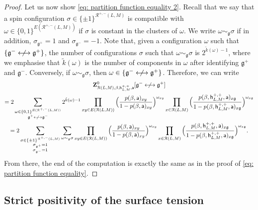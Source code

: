 \documentclass[11pt,a4paper]{article}
\theoremstyle{definition}
\numberwithin{equation}{section}
\newcommand\fg{\mathfrak{g}}
\begin{document}
\begin{proof}
Let us now show \eqref{eq: partition function equality 2}. Recall that we say that a spin configuration $\sigma \in \{\pm 1\}^{\mathcal R^{+,-}(L,M)}$ is compatible with $\omega\in \{0,1\}^{E(\mathcal{R}^{+,-}(L,M))}$ if $\sigma$ is constant in the clusters of $\omega$. We write $\omega\sim_{\fg}\sigma$ if in addition, $\sigma_{\mathfrak g^+}=1$ and $\sigma_{\mathfrak g^-}=-1$. Note that, given a configuration $\omega$ such that $\{\fg^{-} \centernot\longleftrightarrow \fg^{+}\}$, the number of configurations $\sigma$ such that $\omega\sim_{\fg}\sigma$ is $2^{\tilde k(\omega)-1}$, where we emphasise that $\tilde{k}(\omega)$ is the number of components in $\omega$ after identifying $\fg^+$ and $\fg^-$. Conversely, if $\omega\sim_{\mathfrak g} \sigma$, then $\omega \in \{\mathfrak g^- \centernot \longleftrightarrow \mathfrak g^+\}$.  Therefore, we can write
\begin{multline}
{\bf Z}^{0}_{\mathcal{R}(L,M),\beta, \mathsf{h}^{+,+}_{L,M},\mathsf{a}}[\fg^{-} \centernot\longleftrightarrow \fg^{+}]
\\=2 \sum_{\substack{\omega\in \{0,1\}^{E(\mathcal{R}^{+,-}(L,M))}\\ \fg^+\centernot\longleftrightarrow \fg^-}}2^{\tilde{k}(\omega)-1}\prod_{xy \in E(\mathcal{R}(L,M))} \Big(\frac{p(\beta,\mathsf{a})_{xy}}{1-p(\beta,\mathsf{a})_{xy}}\Big)^{\omega_{xy}} \prod_{x \in \mathcal{R}(L,M)} \Big(\frac{p(\beta,\mathsf{h}^{+,+}_{L,M},\mathsf{a})_{x\fg}}{1-p(\beta,\mathsf{h}^{+,+}_{L,M},\mathsf{a})_{x\fg}}\Big)^{\omega_{x\fg}}
\\= 2 \sum_{\substack{\sigma\in \{\pm 1\}^{\mathcal{R}^{+,-}(L,M)}\\\sigma_{\fg^+}=1\\\sigma_{\fg^-}=1}} \sum_{\omega\sim_\fg \sigma}\prod_{xy \in E(\mathcal{R}(L,M))} \Big(\frac{p(\beta,\mathsf{a})_{xy}}{1-p(\beta,\mathsf{a})_{xy}}\Big)^{\omega_{xy}} \prod_{x \in \mathcal{R}(L,M)} \Big(\frac{p(\beta,\mathsf{h}^{+,+}_{L,M},\mathsf{a})_{x\fg}}{1-p(\beta,\mathsf{h}^{+,+}_{L,M},\mathsf{a})_{x\fg}}\Big)^{\omega_{x\fg}}.    
\end{multline}
From there, the end of the computation is exactly the same as in the proof of \eqref{eq: partition function equality}.
\end{proof}




\subsection{Strict positivity of the surface tension}\label{sec:Lebowitz-Pfister}
\end{document}
